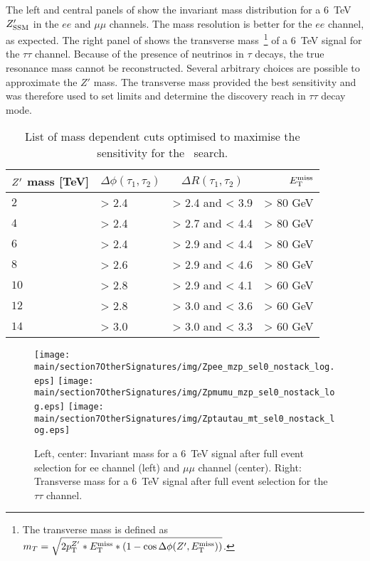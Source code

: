 The left and central panels of  show the invariant mass distribution for a 6~TeV $Z^{\prime}_{\mathrm{SSM}}$ in the $ee$ and $\mu\mu$ channels. The mass resolution is better for the $ee$ channel, as expected. The right panel of  shows the transverse mass~\footnote{The transverse mass is defined as $m_{T}  =  \sqrt{2p_{\text{T}}^{Z^{\prime}}*E_{\mathrm{T}}^{\mathrm{miss}}*(1-\cos\Delta\phi(Z^{\prime},E_{\mathrm{T}}^{\mathrm{miss}}))}$.}
of a 6~TeV signal for the $\tau\tau$ channel. Because of the presence of neutrinos in $\tau$ decays, the true resonance mass cannot be reconstructed. Several arbitrary  choices are possible to approximate the $Z'$ mass. The transverse mass provided the best sensitivity and was therefore used to set limits and determine the discovery reach in $\tau\tau$ decay mode.

\begin{table}[htbp]
   \centering
\begin{tabular}{l|l|c|r}
   $Z^{\prime}$ mass [TeV] &  $\Delta \phi(\tau_1, \tau_2)$&  $\Delta R(\tau_1, \tau_2)$ & $E_{\mathrm{T}}^{\mathrm{miss}}$\\
  \hline
   $2$ & > 2.4 & > 2.4 and < 3.9 & > 80 GeV\\
   $4$ & > 2.4 & > 2.7 and < 4.4 & > 80 GeV\\
   $6$ & > 2.4 & > 2.9 and < 4.4 & > 80 GeV\\
   $8$ & > 2.6 & > 2.9 and < 4.6 & > 80 GeV\\
  $10$ & > 2.8 & > 2.9 and < 4.1 & > 60 GeV\\
  $12$ & > 2.8 & > 3.0 and < 3.6 & > 60 GeV\\
  $14$ & > 3.0 & > 3.0 and < 3.3 & > 60 GeV\\
  \end{tabular}
  \caption{List of mass dependent cuts optimised to maximise the sensitivity for the \Zptata\ search.}
  \label{tab:leptonicresonances:selectiontautau}
\end{table}


\begin{figure}[htbp]
  \centering
  \texttt{[image: \\main/section7OtherSignatures/img/Zpee\_mzp\_sel0\_nostack\_log.eps]}
  \texttt{[image: \\main/section7OtherSignatures/img/Zpmumu\_mzp\_sel0\_nostack\_log.eps]}
  \texttt{[image: \\main/section7OtherSignatures/img/Zptautau\_mt\_sel0\_nostack\_log.eps]}
  \caption{Left, center: Invariant mass for a 6~TeV signal after full event selection for ee channel (left) and $\mu\mu$ channel (center). Right: Transverse mass for a 6~TeV signal after full event selection for the $\tau\tau$ channel. }
  \label{fig:leptonicresonances:masses}
\end{figure}


